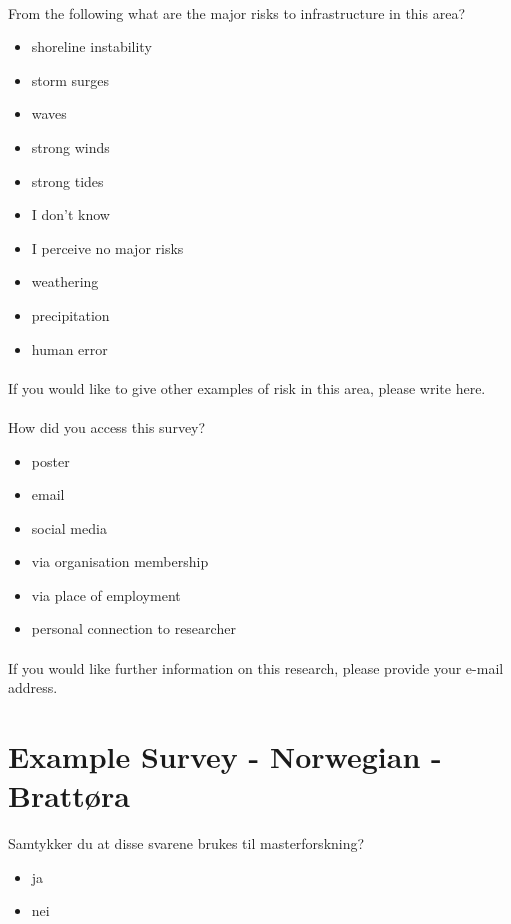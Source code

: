 \paragraph{}

From the following what are the major risks to infrastructure in this area?
\begin{itemize}
    \item shoreline instability
    \item storm surges
    \item waves
    \item strong winds
    \item strong tides
    \item I don't know
    \item I perceive no major risks
    \item weathering
    \item precipitation
    \item human error
\end{itemize}

\paragraph{}
If you would like to give other examples of risk in this area, please write here.
\paragraph{}

How did you access this survey?
\begin{itemize}
    \item poster
    \item email
    \item social media
    \item via organisation membership
    \item via place of employment
    \item personal connection to researcher
\end{itemize}
\paragraph{}

If you would like further information on this research, please provide your e-mail address.
\newpage

\section{Example Survey - Norwegian - Brattøra }
Samtykker du at disse svarene brukes til masterforskning?
\begin{itemize}
    \item ja
    \item nei
\end{itemize}
